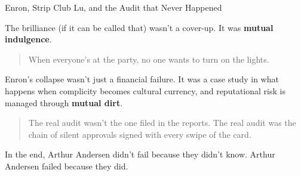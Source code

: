 \begin{HistoricalSidebar}{Enron, Strip Club Lu, and the Audit that Never Happened}
  \medskip
  
  The brilliance (if it can be called that) wasn’t a cover-up. It was \textbf{mutual indulgence}.  
  
  \begin{quote}
  When everyone’s at the party, no one wants to turn on the lights.
  \end{quote}
  
  Enron’s collapse wasn’t just a financial failure. It was a case study in what happens when complicity becomes 
  cultural currency, and reputational risk is managed through \textbf{mutual dirt}.  
  
  \begin{quote}
  The real audit wasn’t the one filed in the reports.  
  The real audit was the chain of silent approvals signed with every swipe of the card.
  \end{quote}
  
  In the end, Arthur Andersen didn’t fail because they didn’t know.  Arthur Andersen failed because they did.
  
\end{HistoricalSidebar}

\medskip
